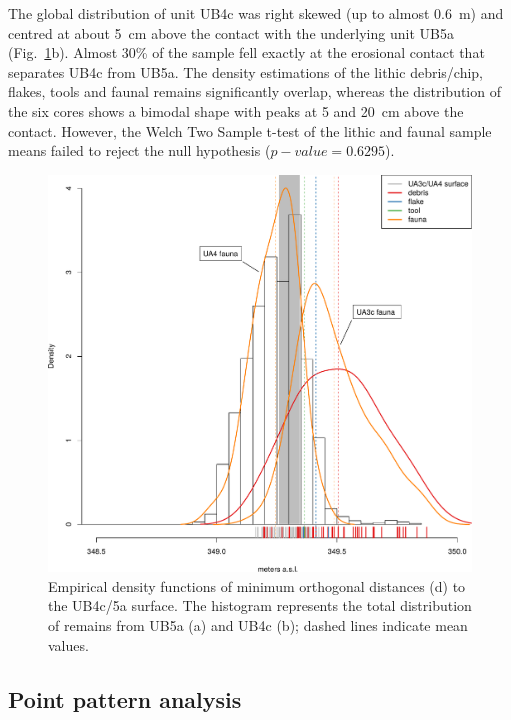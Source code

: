 \documentclass[review,authoryear,times]{elsarticle} %
\begin{document}
The global distribution of unit UB4c was right skewed (up to almost 0.6~m) and centred at about 5~cm above the contact with the underlying unit UB5a (Fig.~\ref{fig:8}b). Almost 30\% of the sample fell exactly at the erosional contact that separates UB4c from UB5a. The density estimations of the lithic debris/chip, flakes, tools and faunal remains significantly overlap, whereas the distribution of the six cores shows a bimodal shape with peaks at 5 and 20~cm above the contact. However, the Welch Two Sample t-test of the lithic and faunal sample means failed to reject the null hypothesis ($p-value=0.6295$). %

\begin{figure}[]
  \centering
  \includegraphics[width=1\textwidth]{../artwork/Fig8.pdf}
  \caption{Empirical density functions of minimum orthogonal distances (d) to the UB4c/5a surface. The histogram represents the total distribution of remains from UB5a (a) and UB4c (b); dashed lines indicate mean values.}
  \label{fig:8}
\end{figure}

\subsection{Point pattern analysis}
\end{document}
